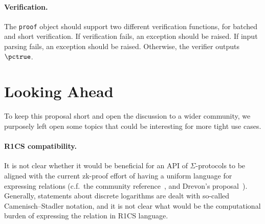 \documentclass[runningheads]{llncs}
\begin{document}
\paragraph{Verification.} The \verb|proof| object should support two different verification functions, for batched and short verification.
If verification fails, an exception should be raised.
If input parsing fails, an exception should be raised.
Otherwise, the verifier outputs $\pctrue$.





\section{Looking Ahead}
To keep this proposal short and open the discussion to a wider community, we purposely left open some topics that could
be interesting for more tight use cases.
\paragraph{R1CS compatibility.} It is not clear whether it would be beneficial for an API of $\Sigma$-protocols to be aligned with the current zk-proof effort of having a uniform
language for expressing relations (c.f.\ the community reference~\cite[section 3]{zkproof-reference}, and Drevon's proposal~\cite{jr1cs}).
Generally, statements about discrete logarithms are dealt with so-called Camenisch--Stadler notation, and it is not clear what would be the computational burden of expressing the relation in R1CS language.



%
\end{document}
